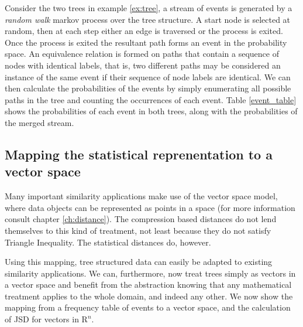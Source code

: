 Consider the two trees in example \ref{ex:tree}, a stream of events is generated by a \textit{random walk} markov process over the tree structure.  A start node is selected at random, then at each step either an edge is traversed or the process is exited. Once the process is exited the resultant path forms an event in the probability space. An equivalence relation is formed on paths that contain a sequence of nodes with identical labels, that is, two different paths may be considered an instance of the same event if their sequence of node labels are identical.  We can then calculate the probabilities of the events by simply enumerating all possible paths in the tree and counting the occurrences of each event.  Table \ref{event_table} shows the probabilities of each event in both trees, along with the probabilities of the merged stream.

\subsection{Mapping the statistical reprenentation to a vector space}\label{vector_space}
Many important similarity applications make use of the vector space model, where data objects can be represented as points in a space (for more information consult chapter \ref{ch:distance}).  The compression based distances do not lend themselves to this kind of treatment, not least because they do not satisfy Triangle Inequality.  The statistical distances do, however.

Using this mapping, tree structured data can easily be adapted to existing similarity applications.  We can, furthermore, now treat trees simply as vectors in a vector space and benefit from the abstraction knowing that any mathematical treatment applies to the whole domain, and indeed any other.  We now show the mapping from a frequency table of events to a vector space, and the calculation of JSD for vectors in $\mathrm{R}^n$.

